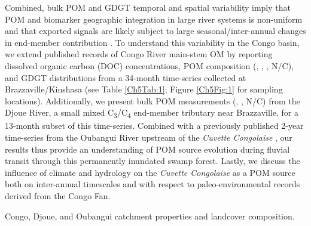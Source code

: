 Combined, bulk POM and GDGT temporal and spatial variability imply that POM and biomarker geographic integration in large river systems is non-uniform and that exported signals are likely subject to large seasonal/inter-annual changes in end-member contribution \citep[\textit{e.g.}][]{Galy:2008jw,Zell:2013eg,Spencer:2016ho}. To understand this variability in the Congo basin, we extend published records of Congo River main-stem OM \citep{Mariotti:1991vx,Coynel:2005cn,Spencer:2012en,Hemingway:2016bq,Spencer:2016ho} by reporting dissolved organic carbon (DOC) concentrations, POM composition (, , , N/C), and GDGT distributions from a 34-month time-series collected at Brazzaville/Kinshasa (see Table \ref{Ch5Tab:1}; Figure \ref{Ch5Fig:1} for sampling locations). Additionally, we present bulk POM measurements (, , N/C) from the Djoue River, a small mixed C\textsubscript{3}/C\textsubscript{4} end-member tributary near Brazzaville, for a 13-month subset of this time-series. Combined with a previously published 2-year time-series from the Oubangui River upstream of the \textit{Cuvette Congolaise}  \citep{Bouillon:2012cw,Bouillon:2014ko}, our results thus provide an understanding of POM source evolution during fluvial transit through this permanently inundated swamp forest. Lastly, we discuss the influence of climate and hydrology on the \textit{Cuvette Congolaise} as a POM source both on inter-annual timescales and with respect to paleo-environmental records derived from the Congo Fan.

\begin{table}[ht]
	\caption[Congo, Djoue, and Oubangui catchment properties and landcover composition]{Congo, Djoue, and Oubangui catchment properties and landcover composition.}
	\label{Ch5Tab:1} 
\end{table}

